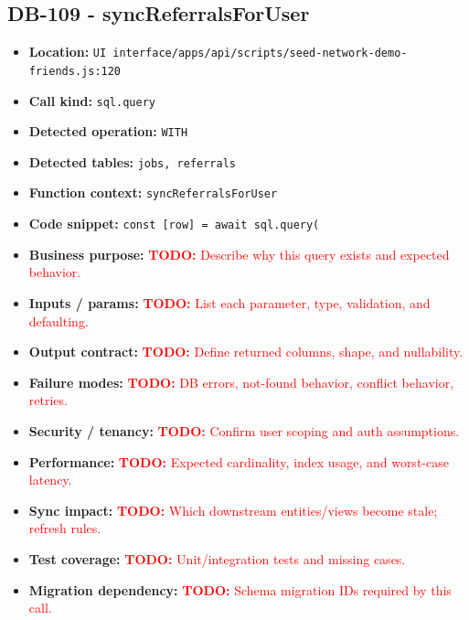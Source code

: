 \documentclass[11pt]{article}
\newcommand{\todoitem}[1]{\textcolor{red}{\textbf{TODO:} #1}}
\begin{document}
\subsection{DB-109 - syncReferralsForUser}
\begin{itemize}[leftmargin=1.5em]
\item \textbf{Location:} \texttt{UI interface/apps/api/scripts/seed-network-demo-friends.js:120}
\item \textbf{Call kind:} \texttt{sql.query}
\item \textbf{Detected operation:} \texttt{WITH}
\item \textbf{Detected tables:} \texttt{jobs, referrals}
\item \textbf{Function context:} \texttt{syncReferralsForUser}
\item \textbf{Code snippet:} \texttt{const [row] = await sql.query(}
\item \textbf{Business purpose:} \todoitem{Describe why this query exists and expected behavior.}
\item \textbf{Inputs / params:} \todoitem{List each parameter, type, validation, and defaulting.}
\item \textbf{Output contract:} \todoitem{Define returned columns, shape, and nullability.}
\item \textbf{Failure modes:} \todoitem{DB errors, not-found behavior, conflict behavior, retries.}
\item \textbf{Security / tenancy:} \todoitem{Confirm user scoping and auth assumptions.}
\item \textbf{Performance:} \todoitem{Expected cardinality, index usage, and worst-case latency.}
\item \textbf{Sync impact:} \todoitem{Which downstream entities/views become stale; refresh rules.}
\item \textbf{Test coverage:} \todoitem{Unit/integration tests and missing cases.}
\item \textbf{Migration dependency:} \todoitem{Schema migration IDs required by this call.}
\end{itemize}
\end{document}
